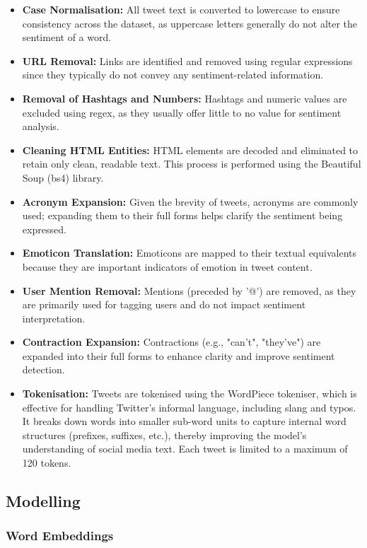 \documentclass{article}
\begin{document}
\begin{itemize}
\item \textbf{Case Normalisation:} All tweet text is converted to lowercase to ensure consistency across the dataset, as uppercase letters generally do not alter the sentiment of a word.
\item  \textbf{URL Removal:} Links are identified and removed using regular expressions since they typically do not convey any sentiment-related information.
\item  \textbf{Removal of Hashtags and Numbers:} Hashtags and numeric values are excluded using regex, as they usually offer little to no value for sentiment analysis.
\item  \textbf{Cleaning HTML Entities:} HTML elements are decoded and eliminated to retain only clean, readable text. This process is performed using the Beautiful Soup (bs4) library.
\item \textbf{Acronym Expansion:} Given the brevity of tweets, acronyms are commonly used; expanding them to their full forms helps clarify the sentiment being expressed.
\item  \textbf{Emoticon Translation:} Emoticons are mapped to their textual equivalents because they are important indicators of emotion in tweet content.
\item  \textbf{User Mention Removal:} Mentions (preceded by '@') are removed, as they are primarily used for tagging users and do not impact sentiment interpretation.
\item  \textbf{Contraction Expansion:} Contractions (e.g., "can’t", "they’ve") are expanded into their full forms to enhance clarity and improve sentiment detection.
\item  \textbf{Tokenisation:} Tweets are tokenised using the WordPiece tokeniser, which is effective for handling Twitter's informal language, including slang and typos. It breaks down words into smaller sub-word units to capture internal word structures (prefixes, suffixes, etc.), thereby improving the model's understanding of social media text. Each tweet is limited to a maximum of 120 tokens.
\end{itemize}

\subsection{Modelling}

\subsubsection{Word Embeddings}
\end{document}
